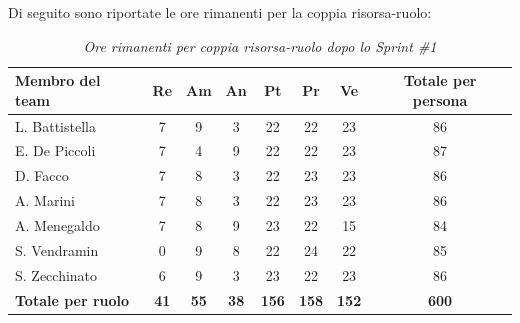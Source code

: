\documentclass[a4paper, 10pt, colorlinks=true, linkcolor=black, urlcolor=blue, citecolor=blue, hidelinks]{article}
\renewcommand{\arraystretch}{1.2}
\begin{document}
Di seguito sono riportate le ore rimanenti per la coppia risorsa-ruolo:
\begin{table}[H]
    \centering
    \renewcommand{\arraystretch}{1.4}
    \begin{tabular}{|l|c|c|c|c|c|c|c|}
        \hline
        \rowcolor{bluBitless!15}
        \textbf{Membro del team} & \textbf{Re} & \textbf{Am} & \textbf{An} & \textbf{Pt} & \textbf{Pr} & \textbf{Ve} & \textbf{Totale per persona} \\
        \hline
        L. Battistella & 7 & 9 & 3 & 22 & 22 & 23 & 86 \\ \hline
        E. De Piccoli & 7 & 4 & 9 & 22 & 22 & 23 & 87 \\ \hline
        D. Facco & 7 & 8 & 3 & 22 & 23 & 23 & 86 \\ \hline
        A. Marini & 7 & 8 & 3 & 22 & 23 & 23 & 86 \\ \hline
        A. Menegaldo & 7 & 8 & 9 & 23 & 22 & 15 & 84 \\ \hline
        S. Vendramin & 0 & 9 & 8 & 22 & 24 & 22 & 85 \\ \hline
        S. Zecchinato & 6 & 9 & 3 & 23 & 22 & 23 & 86 \\ \hline
        \rowcolor{bluBitless!8}
        \textbf{Totale per ruolo} & \textbf{41} & \textbf{55} & \textbf{38} & \textbf{156} & \textbf{158} & \textbf{152} & \textbf{600} \\
        \hline
    \end{tabular}
    \caption{\textit{Ore rimanenti per coppia risorsa-ruolo dopo lo Sprint \#1}}
\end{table}
\end{document}
